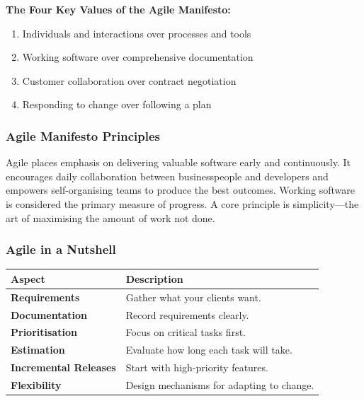 \documentclass{article}
\begin{document}
\vspace{1em} 
\textbf{The Four Key Values of the Agile Manifesto:}
\begin{enumerate}
  \item Individuals and interactions over processes and tools
  \item Working software over comprehensive documentation
  \item Customer collaboration over contract negotiation
  \item Responding to change over following a plan
\end{enumerate}

\subsubsection{Agile Manifesto Principles}
Agile places emphasis on delivering valuable software early and continuously. It encourages daily collaboration between businesspeople and developers and empowers self-organising teams to produce the best outcomes. Working software is considered the primary measure of progress. A core principle is simplicity—the art of maximising the amount of work not done.


\subsubsection{Agile in a Nutshell}
\begin{center}
\begin{tabularx}{\textwidth}{>{\bfseries}l X}
\toprule
Aspect & \textbf{Description} \\
\midrule
Requirements & Gather what your clients want. \\
Documentation & Record requirements clearly. \\
Prioritisation & Focus on critical tasks first. \\
Estimation & Evaluate how long each task will take. \\
Incremental Releases & Start with high-priority features. \\
Flexibility & Design mechanisms for adapting to change. \\
\bottomrule
\end{tabularx}
\end{center}
\end{document}
